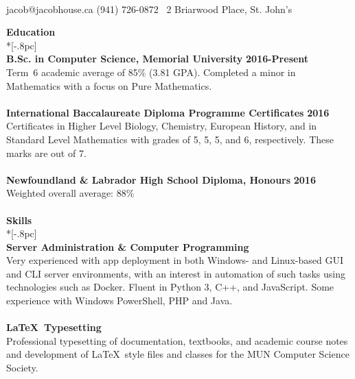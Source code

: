 \documentclass[letterpaper]{article}
\let\dateshape\bf
\begin{document}
\vspace*{-2.75pc}
\begin{center}
	\scalebox{1.2}{\Huge Jacob W.F. House} \\[.75pc]
	{\Large{}} jacob@jacobhouse.ca \quad 
	{\Large{}} (941) 726-0872 \quad
	\faHome\ 2 Briarwood Place, St. John's
	\\[2pc]
\end{center}

{\large \bf Education} \\*[-.8pc]
\underline{\hspace{\textwidth}} \\[0.5pc]
{\bf B.Sc. in Computer Science, Memorial University} \hfill {\dateshape 2016-Present} \\
Term~6 academic average of 85\% (3.81 GPA). Completed a minor in Mathematics with a focus on Pure Mathematics. \\
\\
{\bf International Baccalaureate Diploma Programme Certificates} \hfill {\dateshape 2016} \\
Certificates in Higher Level Biology, Chemistry, European History, and in Standard 
Level Mathematics with grades of 5, 5, 5, and 6, respectively. These marks are out of 7. \\
\\
{\bf Newfoundland \& Labrador High School Diploma, Honours} \hfill {\dateshape 2016} \\
Weighted overall average: 88\% \\
\\[0.5pc]
{\large \bf Skills} \\*[-.8pc]
\underline{\hspace{\textwidth}} \\[0.5pc]
{\bf Server Administration \& Computer Programming} \\
Very experienced with app deployment in both Windows- and Linux-based GUI and CLI server environments, with an interest in automation of such tasks using technologies such as Docker. Fluent in Python 3, C++, and JavaScript. Some experience with Windows PowerShell, PHP and Java. \\
\\
{\bf \LaTeX\ Typesetting} \\
Professional typesetting of documentation, textbooks, and academic course notes and development of \LaTeX\ style files and classes for the MUN Computer Science Society. \\
\end{document}
